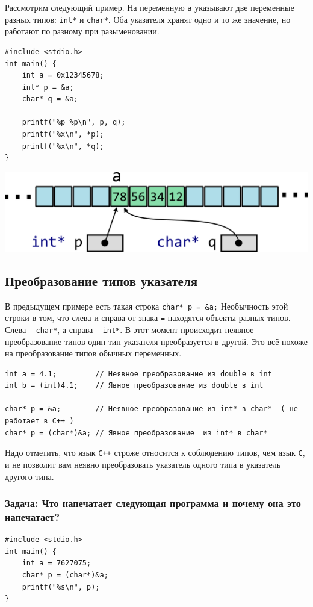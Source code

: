 \documentclass{article}
\begin{document}
Рассмотрим следующий пример. На переменную \texttt{a} указывают две переменные разных типов: \texttt{int*} и \texttt{char*}. Оба указателя хранят одно и то же значение, но работают по разному при разыменовании.

\begin{multicols}{2}
\begin{lstlisting}
#include <stdio.h>
int main() {
    int a = 0x12345678;
    int* p = &a;
    char* q = &a;
    
    printf("%p %p\n", p, q);
    printf("%x\n", *p);
    printf("%x\n", *q);
}
\end{lstlisting}
\vfill
\columnbreak
\hfill \break
\begin{center}
\includegraphics[scale=0.65]{../images/memory/memory_int_char_pointer.png}
\end{center}
\hfill \break
\end{multicols}

\subsection*{Преобразование типов указателя}
В предыдущем примере есть такая строка \texttt{char* p = \&a;} Необычность этой строки в том, что слева и справа от знака \texttt{=} находятся объекты разных типов. Слева -- \texttt{char*}, а справа -- \texttt{int*}. В этот момент происходит неявное преобразование типов один тип указателя преобразуется в другой. Это всё похоже на преобразование типов обычных переменных.
\begin{lstlisting}
int a = 4.1;         // Неявное преобразование из double в int
int b = (int)4.1;    // Явное преобразование из double в int

char* p = &a;        // Неявное преобразование из int* в char*  ( не работает в C++ )
char* p = (char*)&a; // Явное преобразование  из int* в char*
\end{lstlisting}
Надо отметить, что язык \texttt{C++} строже относится к соблюдению типов, чем язык \texttt{C}, и не позволит вам неявно преобразовать указатель одного типа в указатель другого типа.

\subsubsection*{Задача: Что напечатает следующая программа и почему она это напечатает?}
\begin{lstlisting} 
#include <stdio.h>
int main() {
    int a = 7627075;
    char* p = (char*)&a;
    printf("%s\n", p);
}
\end{lstlisting}
\end{document}

